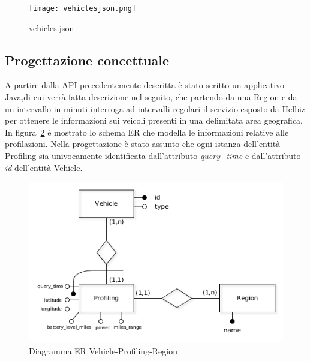 \begin{figure}[H]
\centering
\texttt{[image: vehiclesjson.png]}
\caption{vehicles.json}
\label{fig:vehiclesjson}
\end{figure}

\subsection{Progettazione concettuale}

A partire dalla API precedentemente descritta è stato scritto un applicativo Java,di cui
verrà fatta descrizione nel seguito, che partendo da una Region e da un intervallo in
minuti interroga ad intervalli regolari il servizio esposto da Helbiz per ottenere le
informazioni sui veicoli presenti in una delimitata area geografica.
In figura~\ref{fig:vehicle_profiling_er} è mostrato lo schema ER che modella le informazioni
relative alle profilazioni. Nella progettazione è stato assunto che ogni istanza
dell'entità Profiling sia univocamente identificata dall'attributo \textit{query\_time} e
dall'attributo \textit{id} dell'entità Vehicle.

\begin{figure}[H]                                                                                                                                                            
\centering                                                                                                                                                                   
\includegraphics[width=\textwidth]{diagrams/vehicle_profiling_er}                                                                                                                                   
\caption{Diagramma ER Vehicle-Profiling-Region}                                                                                                                                            
\label{fig:vehicle_profiling_er}                                                                                                                                                           
\end{figure}

